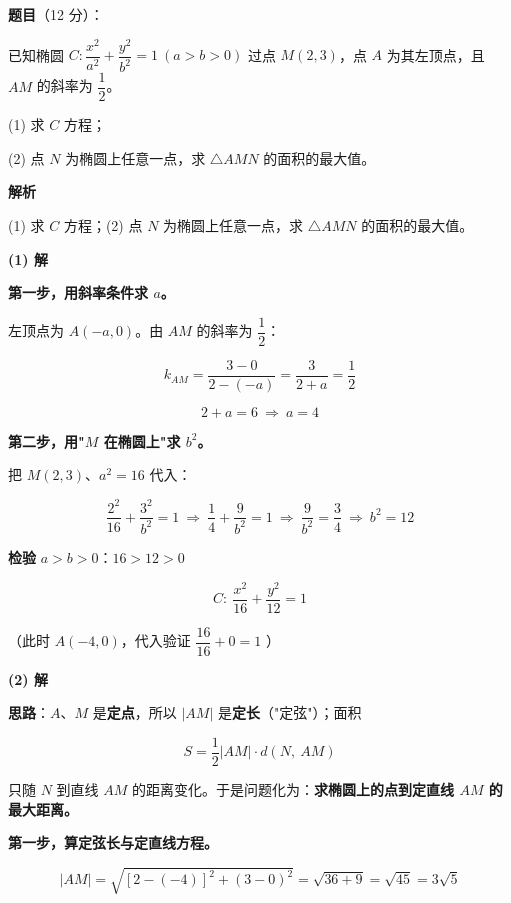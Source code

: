 \begin{answer}

\textbf{题目}（12 分）：

已知椭圆 $C:\dfrac{x^{2}}{a^{2}}+\dfrac{y^{2}}{b^{2}}=1\ (a>b>0)$ 过点 $M(2,3)$，点 $A$ 为其左顶点，且 $AM$ 的斜率为 $\dfrac12$。

  (1) 求 $C$ 方程；

  (2) 点 $N$ 为椭圆上任意一点，求 $\triangle AMN$ 的面积的最大值。

\textbf{解析}

  (1) 求 $C$ 方程；(2) 点 $N$ 为椭圆上任意一点，求 $\triangle AMN$ 的面积的最大值。

\par\medskip

\textbf{(1) 解}

\textbf{第一步，用斜率条件求 $a$。}

左顶点为 $A(-a,0)$。由 $AM$ 的斜率为 $\dfrac12$：

\nopagebreak[4]
\[k_{AM}=\frac{3-0}{2-(-a)}=\frac3{2+a}=\frac12\]

\nopagebreak[4]
\[2+a=6\ \Longrightarrow\ a=4\]

\textbf{第二步，用"$M$ 在椭圆上"求 $b^{2}$。}

把 $M(2,3)$、$a^{2}=16$ 代入：

\nopagebreak[4]
\[\frac{2^{2}}{16}+\frac{3^{2}}{b^{2}}=1\ \Longrightarrow\ \frac14+\frac9{b^{2}}=1\ \Longrightarrow\ \frac9{b^{2}}=\frac34\ \Longrightarrow\ b^{2}=12\]

\textbf{检验} $a>b>0$：$16>12>0$ 

\nopagebreak[4]
\[\boxed{C:\ \frac{x^{2}}{16}+\frac{y^{2}}{12}=1}\]

（此时 $A(-4,0)$，代入验证 $\dfrac{16}{16}+0=1$ ）

\par\medskip

\textbf{(2) 解}

\textbf{思路}：$A$、$M$ 是\textbf{定点}，所以 $|AM|$ 是\textbf{定长}（"定弦"）；面积

\nopagebreak[4]
\[S=\frac12|AM|\cdot d(N,\ AM)\]

只随 $N$ 到直线 $AM$ 的距离变化。于是问题化为：\textbf{求椭圆上的点到定直线 $AM$ 的最大距离。}

\textbf{第一步，算定弦长与定直线方程。}

\nopagebreak[4]
\[|AM|=\sqrt{\left[2-(-4)\right]^{2}+(3-0)^{2}}=\sqrt{36+9}=\sqrt{45}=3\sqrt5\]


\end{answer}
